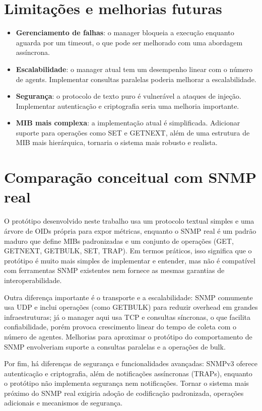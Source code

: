 \documentclass[12pt,a4paper]{article}
\begin{document}
\section{Limitações e melhorias futuras}
\begin{itemize}
	\item \textbf{Gerenciamento de falhas}: o manager bloqueia a execução enquanto aguarda por um timeout, o que pode ser melhorado com uma abordagem assíncrona.
	\item \textbf{Escalabilidade}: o manager atual tem um desempenho linear com o número de agents. Implementar consultas paralelas poderia melhorar a escalabilidade.
	\item \textbf{Segurança}: o protocolo de texto puro é vulnerável a ataques de injeção. Implementar autenticação e criptografia seria uma melhoria importante.
	\item \textbf{MIB mais complexa}: a implementação atual é simplificada. Adicionar suporte para operações como SET e GETNEXT, além de uma estrutura de MIB mais hierárquica, tornaria o sistema mais robusto e realista.
\end{itemize}

\section{Comparação conceitual com SNMP real}

O protótipo desenvolvido neste trabalho usa um protocolo textual simples e uma árvore de OIDs própria para expor métricas, enquanto o SNMP real é um padrão maduro que define MIBs padronizadas e um conjunto de operações (GET, GETNEXT, GETBULK, SET, TRAP). Em termos práticos, isso significa que o protótipo é muito mais simples de implementar e entender, mas não é compatível com ferramentas SNMP existentes nem fornece as mesmas garantias de interoperabilidade.

Outra diferença importante é o transporte e a escalabilidade: SNMP comumente usa UDP e inclui operações (como GETBULK) para reduzir overhead em grandes infraestruturas; já o manager aqui usa TCP e consultas síncronas, o que facilita confiabilidade, porém provoca crescimento linear do tempo de coleta com o número de agentes. Melhorias para aproximar o protótipo do comportamento de SNMP envolveriam suporte a consultas paralelas e a operações de bulk.

Por fim, há diferenças de segurança e funcionalidades avançadas: SNMPv3 oferece autenticação e criptografia, além de notificações assíncronas (TRAPs), enquanto o protótipo não implementa segurança nem notificações. Tornar o sistema mais próximo do SNMP real exigiria adoção de codificação padronizada, operações adicionais e mecanismos de segurança.
\end{document}
